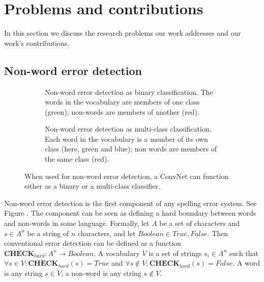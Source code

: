 

\section{Problems and contributions}

In this section we discuss the research problems our work addresses and our work's contributions.  

\subsection{Non-word error detection} 

\begin{figure}
\centering
    \captionsetup[subfigure]{justification=centering}
    \begin{subfigure}{.5\textwidth}
    \centering
    
    \caption{Non-word error detection as binary classification.  The words in the vocabulary are members of one class (green); non-words are members of another (red).}
    \label{fig:ConvNetBinaryErrorDetection}
    \end{subfigure}
    
    \begin{subfigure}{.5\textwidth}
    \centering
    
    \caption{Non-word error detection as multi-class classification.  Each word in the vocabulary is a member of its own class (here, green and blue); non words are members of the same class (red).}
    \label{fig:ConvNetMulticlassErrorDetection}
    \end{subfigure}
\caption{When used for non-word error detection, a ConvNet can function either as a binary or a multi-class classifier.}
\label{fig:ErrorDetectionAndClassification}
\end{figure}

Non-word error detection is the first component of any spelling error system.  See Figure \label{fig:SpellingSystemStepsCheck}.  The component can be seen as defining a hard boundary between words and non-words in some language.  Formally, let $A$ be a set of characters and $s \in A^n$ be a string of $n$ characters, and let $Boolean \in { True, False }$.  Then conventional error detection can be defined as a function $\textbf{CHECK}_{hard}: A^n \to Boolean$.  A vocabulary $V$ is a set of strings $s_i \in A^n$ such that $\forall s \in V: \textbf{CHECK}_{hard}(s) = True$ and $\forall s \notin V: \textbf{CHECK}_{hard}(s) = False$.  A word is any string $s \in V$; a non-word is any string $s \notin V$.

